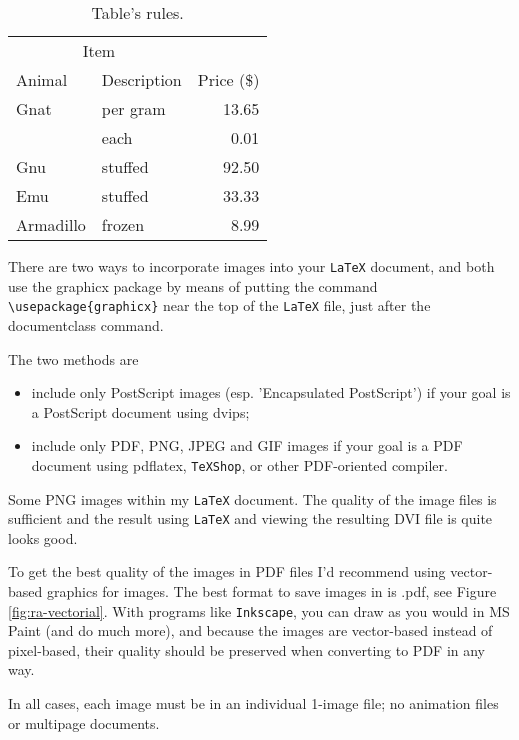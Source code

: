 \begin{table}[ht]
	\caption{Table's rules.}
	\label{tab:results}
\centering
\begin{tabular}{llr}
\toprule
\multicolumn{2}{c}{Item} \\
\cmidrule(r){1-2}
Animal & Description & Price (\$) 
\\
\midrule
Gnat  & per gram & 13.65 \\
      & each     &  0.01 \\
Gnu   & stuffed  & 92.50 \\
Emu   & stuffed  & 33.33 \\
Armadillo & frozen & 8.99 \\
\bottomrule
\end{tabular}
\end{table}

\begin{sloppypar}
There are two ways to incorporate images into your \texttt{LaTeX} document, and both use the graphicx package by means of putting the command  \verb!\usepackage{graphicx}!  near the top of the \texttt{LaTeX} file, just after the documentclass command.
\end{sloppypar}

The two methods are

\begin{itemize}
\item  include only PostScript images (esp. 'Encapsulated PostScript') if your goal is a PostScript document using dvips;
\item include only PDF, PNG, JPEG and GIF images if your goal is a PDF document using pdflatex, \texttt{TeXShop}, or other PDF-oriented compiler. 
\end{itemize}

Some PNG images within my \texttt{LaTeX} document. The quality of the image files is sufficient and the result using \texttt{LaTeX} and viewing the resulting DVI file is quite looks good.

To get the best quality of the images in  PDF files I'd recommend using vector-based graphics for images. The best format to save images in is .pdf, see Figure \ref{fig:ra-vectorial}. With programs like \texttt{Inkscape}, you can draw as you would in MS Paint (and do much more), and because the images are vector-based instead of pixel-based, their quality should be preserved when converting to PDF in any way.    

In all cases, each image must be in an individual 1-image file; no animation files or multipage documents. 

